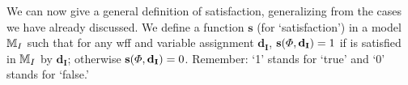 We can now give a general definition of satisfaction, generalizing from the cases we have already discussed. We define a function $\mathbf{s}$ (for `satisfaction') in a model $\mathbb{M}_I$ such that for any wff \metaA{} and variable assignment $\mathbf{d_I}$, $\mathbf{s}(\varPhi{}, \mathbf{d_I})=1$ if \metaA{} is satisfied in $\mathbb{M}_I$ by $\mathbf{d_I}$; otherwise $\mathbf{s}(\varPhi{}, \mathbf{d_I})=0$. Remember: `1' stands for `true' and `0' stands for `false.' 


